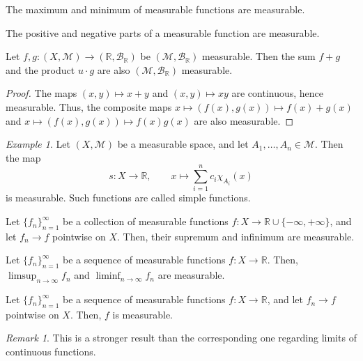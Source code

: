 \documentclass[11pt]{article}
\newcommand{\R}{\mathbb{R}}
\newcommand{\M}{\mathcal{M}}
\theoremstyle{definition}
\theoremstyle{remark}
\newtheorem*{remark}{Remark}
\newtheorem*{example}{Example}
\numberwithin{equation}{section}
\begin{document}
    \begin{lemma}
        The maximum and minimum of measurable functions are measurable.
    \end{lemma}
    \begin{corollary}
        The positive and negative parts of a measurable function are measurable.
    \end{corollary}
    

    \begin{corollary}
        Let $f, g\colon (X, \M) \to (\R, \mathcal{B}_\R)$ be $(\M, \mathcal{B}_\R)$
        measurable. Then the sum $f + g$ and the product $u\cdot g$ are also $(\M,
        \mathcal{B}_\R)$ measurable.
    \end{corollary}
    \begin{proof}
        The maps $(x, y) \mapsto x + y$ and $(x, y) \mapsto xy$ are continuous, hence
        measurable. Thus, the composite maps $x \mapsto (f(x), g(x)) \mapsto f(x) +
        g(x)$ and $x \mapsto (f(x), g(x)) \mapsto f(x)g(x)$ are also measurable.
    \end{proof}

    \begin{example}
        Let $(X, \M)$ be a measurable space, and let $A_1, \dots, A_n \in \M$. Then
        the map \[
            s\colon X \to \R, \qquad x \mapsto \sum_{i = 1}^n c_i \chi_{A_i}(x)
        \] is measurable. Such functions are called simple functions.
    \end{example}

    \begin{theorem}
        Let $\{f_n\}_{n = 1}^\infty$ be a collection of measurable functions $f\colon
        X \to \R \cup \{-\infty, +\infty\}$, and let $f_n \to f$ pointwise on $X$.
        Then, their supremum and infinimum are measurable.
    \end{theorem}
    
    \begin{theorem}
        Let $\{f_n\}_{n = 1}^\infty$ be a sequence of measurable functions $f\colon X
        \to \R$. Then, $\limsup_{n \to \infty} f_n$ and $\liminf_{n \to \infty} f_n$
        are measurable.
    \end{theorem}
    
    \begin{theorem}
        Let $\{f_n\}_{n = 1}^\infty$ be a sequence of measurable functions $f\colon X
        \to \R$, and let $f_n \to f$ pointwise on $X$. Then, $f$ is measurable.
        \begin{remark}
            This is a stronger result than the corresponding one regarding limits of
            continuous functions.
        \end{remark}
    \end{theorem}
\end{document}
